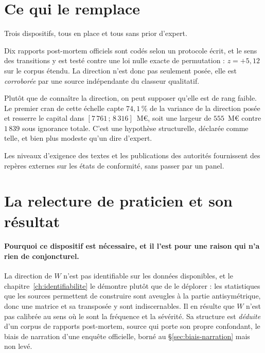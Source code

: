 \section{Ce qui le remplace}

Trois dispositifs, tous en place et tous sans prior d'expert.

\begin{description}[itemsep=3pt,topsep=3pt]
\item[Le corpus documentaire.] Dix rapports post-mortem officiels sont codés selon un protocole
      écrit, et le sens des transitions y est testé contre une loi nulle exacte de permutation :
      $z = +5{,}12$ sur le corpus étendu. La direction n'est donc pas seulement posée, elle est
      \emph{corroborée} par une source indépendante du classeur qualitatif.
\item[L'échelle de repli sur la direction.] Plutôt que de connaître la direction, on peut
      supposer qu'elle est de rang faible. Le premier cran de cette échelle capte $74{,}1\,\%$
      de la variance de la direction posée et resserre le capital dans
      $[7\,761\,;\,8\,316]$~M\euro, soit une largeur de $555$~M\euro{} contre $1\,839$ sous
      ignorance totale. C'est une hypothèse structurelle, déclarée comme telle, et bien plus
      modeste qu'un dire d'expert.
\item[Les ancrages réglementaires.] Les niveaux d'exigence des textes et les publications des
      autorités fournissent des repères externes sur les états de conformité, sans passer par un
      panel.
\end{description}


\section{La relecture de praticien et son résultat}
\label{sec:relecture-praticien}

\paragraph{Pourquoi ce dispositif est nécessaire, et il l'est pour une raison qui n'a rien de
conjoncturel.} La direction de $W$ n'est pas identifiable sur les données disponibles,
et le chapitre~\ref{ch:identifiabilite} le démontre plutôt que de le déplorer : les statistiques
que les sources permettent de construire sont aveugles à la partie antisymétrique, donc une
matrice et sa transposée y sont indiscernables. Il en résulte que $W$ n'est pas calibrée au sens où le sont la fréquence et
la sévérité. Sa structure est \emph{déduite} d'un corpus de rapports post-mortem, source qui
porte son propre confondant, le biais de narration d'une enquête officielle, borné au
\S\ref{sec:biais-narration} mais non levé.

